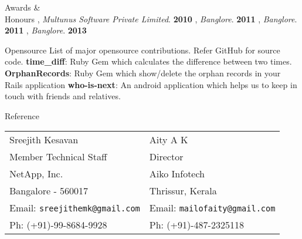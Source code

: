\documentclass{resume}
\begin{document}

\begin{category}{Awards \&\\ Honours}
  , {\em Multunus Software Private Limited}. \hfill \textbf{2010}
  , {\em Banglore}. \hfill \textbf{2011}
  , {\em Banglore}. \hfill \textbf{2011}
  , {\em Banglore}. \hfill \textbf{2013}
\end{category}



\begin{category}{Opensource}
  \citemnobullet List of major opensource contributions. Refer GitHub for source code.
  \citembullet \textbf{time\_diff}: Ruby Gem which calculates the difference between two times.
  \citembullet \textbf{OrphanRecords}: Ruby Gem which show/delete the orphan records in your Rails application
  \citembullet \textbf{who-is-next}: An android application which helps us to keep in touch with friends and relatives.
\end{category}


\begin{category}{Reference}
  \citemnobullet \\
  \begin{tabular}{ll}Sreejith Kesavan&Aity A K\\
    Member Technical Staff&Director\\
    NetApp, Inc.&Aiko Infotech\\
    Bangalore - 560017&Thrissur, Kerala\\
    Email: \mbox{\small\tt sreejithemk@gmail.com}&Email: \mbox{\small\tt mailofaity@gmail.com}\\
    Ph: (+91)-99-8684-9928&Ph: (+91)-487-2325118
  \end{tabular}
\end{category}
\end{document}
